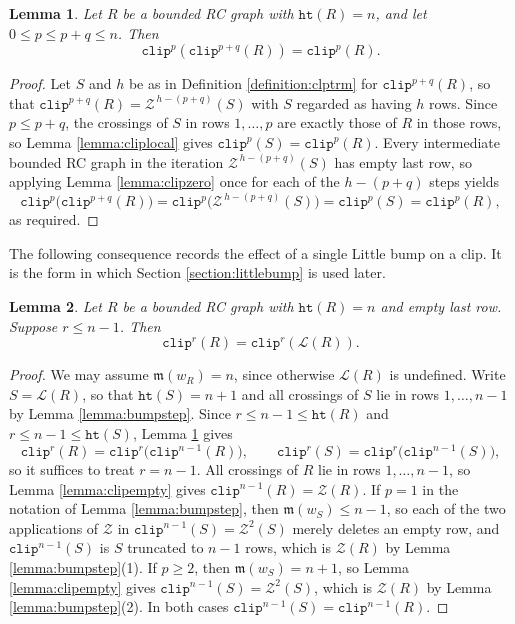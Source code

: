 \documentclass{amsart}
\newtheorem{lemma}{Lemma}[subsection]
\theoremstyle{definition}
\theoremstyle{remark}
\numberwithin{equation}{subsection}
\newcommand{\wof}[1]{w_{#1}}
\newcommand{\zeromap}{\mathcal{Z}}
\newcommand{\hr}{\mathtt{ht}}
\newcommand{\clp}{\mathtt{clip}}
\newcommand{\lmap}{\mathscr{L}}
\newcommand{\maxd}{\mathfrak{m}}
\begin{document}
\begin{lemma} \label{lemma:clpfunc}
Let $R$ be a bounded RC graph with $\hr(R)=n$, and let $0\leq p\leq p+q\leq n$. Then
$$\clp^p(\clp^{p+q}(R))=\clp^p(R).$$
\end{lemma}
\begin{proof}
Let $S$ and $h$ be as in Definition \ref{definition:clptrm} for $\clp^{p+q}(R)$, so that $\clp^{p+q}(R)=\zeromap^{\,h-(p+q)}(S)$ with $S$ regarded as having $h$ rows. Since $p\leq p+q$, the crossings of $S$ in rows $1,\ldots,p$ are exactly those of $R$ in those rows, so Lemma \ref{lemma:cliplocal} gives $\clp^p(S)=\clp^p(R)$. Every intermediate bounded RC graph in the iteration $\zeromap^{\,h-(p+q)}(S)$ has empty last row, so applying Lemma \ref{lemma:clipzero} once for each of the $h-(p+q)$ steps yields
$$\clp^p\bigl(\clp^{p+q}(R)\bigr)=\clp^p\bigl(\zeromap^{\,h-(p+q)}(S)\bigr)=\clp^p(S)=\clp^p(R),$$
as required.
\end{proof}

The following consequence records the effect of a single Little bump on a clip. It is the form in which Section \ref{section:littlebump} is used later.

\begin{lemma}\label{lemma:cliplmap}
  Let $R$ be a bounded RC graph with $\hr(R)=n$ and empty last row. Suppose $r\leq n-1$. Then
  $$\clp^{r}(R)=\clp^{r}(\lmap(R)).$$
\end{lemma}
\begin{proof}
We may assume $\maxd(\wof R)=n$, since otherwise $\lmap(R)$ is undefined. Write $S=\lmap(R)$, so that $\hr(S)=n+1$ and all crossings of $S$ lie in rows $1,\ldots,n-1$ by Lemma \ref{lemma:bumpstep}. Since $r\leq n-1\leq\hr(R)$ and $r\leq n-1\leq\hr(S)$, Lemma \ref{lemma:clpfunc} gives
$$\clp^{r}(R)=\clp^{r}\bigl(\clp^{n-1}(R)\bigr),\qquad \clp^{r}(S)=\clp^{r}\bigl(\clp^{n-1}(S)\bigr),$$
so it suffices to treat $r=n-1$. All crossings of $R$ lie in rows $1,\ldots,n-1$, so Lemma \ref{lemma:clipempty} gives $\clp^{n-1}(R)=\zeromap(R)$. If $p=1$ in the notation of Lemma \ref{lemma:bumpstep}, then $\maxd(\wof S)\leq n-1$, so each of the two applications of $\zeromap$ in $\clp^{n-1}(S)=\zeromap^{2}(S)$ merely deletes an empty row, and $\clp^{n-1}(S)$ is $S$ truncated to $n-1$ rows, which is $\zeromap(R)$ by Lemma \ref{lemma:bumpstep}(1). If $p\geq 2$, then $\maxd(\wof S)=n+1$, so Lemma \ref{lemma:clipempty} gives $\clp^{n-1}(S)=\zeromap^{2}(S)$, which is $\zeromap(R)$ by Lemma \ref{lemma:bumpstep}(2). In both cases $\clp^{n-1}(S)=\clp^{n-1}(R)$.
\end{proof}
\end{document}
